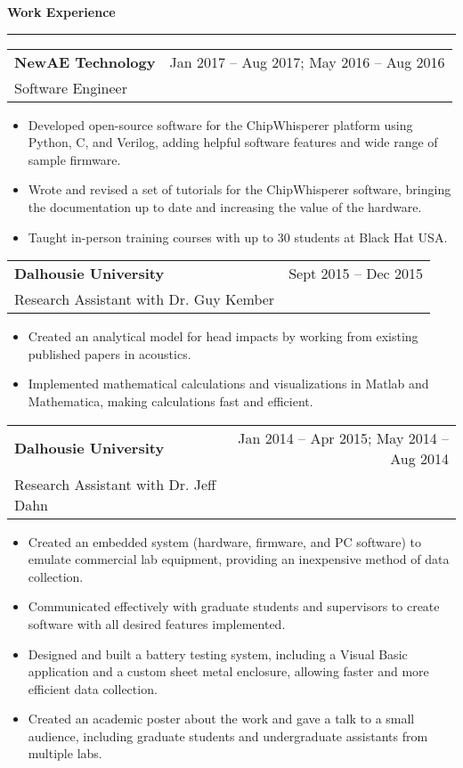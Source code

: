 \documentclass{article}
\newcommand{\heading}[1]
{
	\vspace{3pt}
	\textbf{#1} 
	\vspace{-6pt}
	
	\rule{\linewidth}{0.4pt}
}
\begin{document}
\clearpage
\heading{Work Experience}
\begin{center}
\begin{tabularx}{\textwidth}{Xr}
	\textbf{NewAE Technology}		& Jan 2017 -- Aug 2017; May 2016 -- Aug 2016 \\
	Software Engineer
\end{tabularx}
\end{center}
\begin{itemize}
	\item Developed open-source software for the ChipWhisperer platform using Python, C, and Verilog, adding helpful software features and wide range of sample firmware.
	\item Wrote and revised a set of tutorials for the ChipWhisperer software, bringing the documentation up to date and increasing the value of the hardware.
    \item Taught in-person training courses with up to 30 students at Black Hat USA.
\end{itemize}

\begin{center}
\begin{tabularx}{\textwidth}{Xr}
	\textbf{Dalhousie University}	& Sept 2015 -- Dec 2015 \\
	Research Assistant with Dr. Guy Kember
\end{tabularx}
\end{center}
\begin{itemize}
	\item Created an analytical model for head impacts by working from existing published papers in acoustics.
	\item Implemented mathematical calculations and visualizations in Matlab and Mathematica, making calculations fast and efficient.
\end{itemize}

\begin{center}
\begin{tabularx}{\textwidth}{Xr}
	\textbf{Dalhousie University}	& 
	Jan 2014 -- Apr 2015; May 2014 -- Aug 2014 \\
	Research Assistant with Dr. Jeff Dahn
\end{tabularx}
\end{center}
\begin{itemize}
	\item Created an embedded system (hardware, firmware, and PC software) to emulate commercial lab equipment, providing an inexpensive method of data collection.
	\item Communicated effectively with graduate students and supervisors to create software with all desired features implemented.
	\item Designed and built a battery testing system, including a Visual Basic application and a custom sheet metal enclosure, allowing faster and more efficient data collection.
	\item Created an academic poster about the work and gave a talk to a small audience, including graduate students and undergraduate assistants from multiple labs.
\end{itemize}
\end{document}
